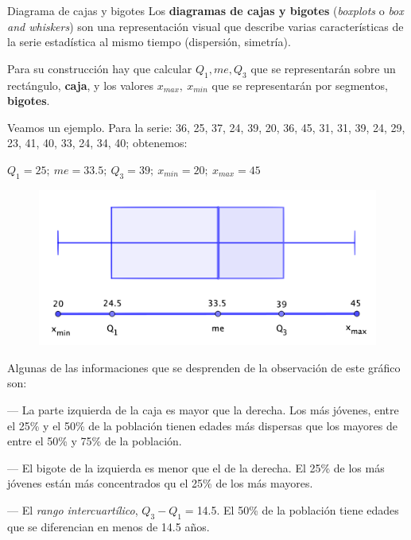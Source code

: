 \vspace{5mm}%
\begin{myalertblock}{Diagrama de cajas y bigotes}
	Los \textbf{diagramas de cajas y bigotes} (\emph{boxplots} o \emph{box and whiskers}) son una representación visual que describe varias características de la serie estadística al mismo tiempo (dispersión, simetría).
	
	\vspace{2mm} Para su construcción hay que calcular $Q_1, me, Q_3$ que se representarán sobre un rectángulo, \textbf{caja}, y los valores $x_{max},\ x_{min}$ que se representarán por segmentos, \textbf{bigotes}.
	
	\vspace{2mm} Veamos un ejemplo. Para la serie: 36, 25, 37, 24, 39, 20, 36, 45, 31, 31, 39, 24, 29, 23, 41, 40, 33, 24, 34, 40; obtenemos:
	
	\vspace{2mm} $Q_1=25;\ me=33.5;\  Q_3=39;\ x_{min}=20;\ x_{max}=45$

	\begin{figure}[H]
			\centering
			\includegraphics[width=.65\textwidth]{imagenes/imagenes01/T01IM15.png}
	\end{figure}
	
	\vspace{2mm} Algunas de las informaciones que se desprenden de la observación de este gráfico son:
	
	\vspace{1mm} --- La parte izquierda de la caja es mayor que la derecha. Los más jóvenes, entre el 25\% y el 50\% de la población tienen edades más dispersas que los mayores de entre el 50\% y 75\% de la población.
	
	\vspace{1mm} --- El bigote de la izquierda es menor que el de la derecha. El 25\% de los más jóvenes están más concentrados qu el 25\% de los más mayores.
	
	\vspace{1mm} --- El \emph{rango intercuartílico}, $Q_3-Q_1=$14.5. El 50\% de la población tiene edades que se diferencian en menos de 14.5 años.
	

\end{myalertblock}
